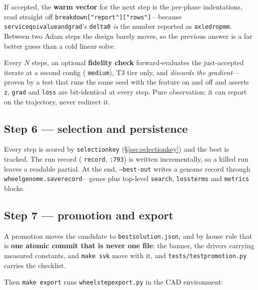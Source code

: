 \documentclass[11pt,a4paper]{article}
\DeclareRobustCommand{\code}[1]{%
  \texttt{\small\def\_{\textunderscore\discretionary{}{}{}}#1}}
\begin{document}
If accepted, the \textbf{warm vector} for the next step is the per-phase indentations,
read straight off \code{breakdown["report"]["rows"]}---because
\code{service\_qoi\_value\_and\_grad}'s \code{delta0} \emph{is} the number reported as
\code{axle\_drop\_mm}. Between two Adam steps the design barely moves, so the previous
answer is a far better guess than a cold linear solve.

Every $N$ steps, an optional \textbf{fidelity check} forward-evaluates the just-accepted
iterate at a second config (\code{medium}), T3 tier only, and \emph{discards the
gradient}---proven by a test that runs the same seed with the feature on and off and
asserts \code{z}, \code{grad} and \code{loss} are bit-identical at every step. Pure
observation: it can report on the trajectory, never redirect it.

\subsection*{Step 6 --- selection and persistence}

Every step is scored by \code{selection\_key} (\S\ref{sec:selectionkey}) and the best is
tracked. The run record (\code{\_record}, \code{:793}) is written incrementally, so a
killed run leaves a readable partial. At the end, \code{--best-out} writes a genome
record through \code{wheel\_genome.save\_record}---genes plus top-level \code{search},
\code{loss\_terms} and \code{metrics} blocks.

\subsection*{Step 7 --- promotion and export}

A promotion moves the candidate to \code{best\_solution.json}, and by house rule that is
\textbf{one atomic commit that is never one file}: the banner, the drivers carrying
measured constants, and \code{make svk} move with it, and
\code{tests/test\_promotion.py} carries the checklist.

Then \code{make export} runs \code{wheel\_step\_export.py} in the CAD environment:
\end{document}
